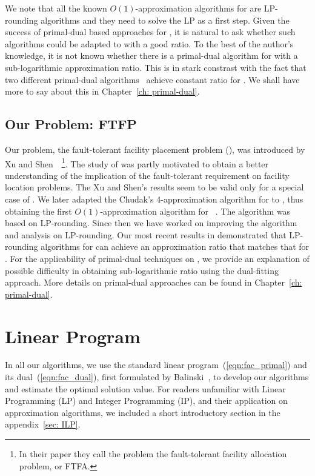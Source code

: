 \documentclass[oneside,final]{ucr}
\begin{document}
We note that all the known $O(1)$-approximation algorithms
for {\FTFL} are LP-rounding algorithms and they need to
solve the LP as a first step. Given the success of
primal-dual based approaches for {\UFL}, it is natural to
ask whether such algorithms could be adapted to {\FTFL} with
a good ratio. To the best of the author's knowledge, it is
not known whether there is a primal-dual algorithm for
{\FTFL} with a sub-logarithmic approximation ratio. This is
in stark constrast with the fact that two different
primal-dual algorithms~\cite{JainV03,JainMMSV03} achieve
constant ratio for {\UFL}. We shall have more to say about
this in Chapter~\ref{ch: primal-dual}.

\section{Our Problem: FTFP}
Our problem, the fault-tolerant facility placement problem
(\FTFP), was introduced by Xu and
Shen~\cite{XuS09}~\footnote{In their paper they call the
  problem the fault-tolerant facility allocation problem, or
  FTFA.}. The study of {\FTFP} was partly motivated to
obtain a better understanding of the implication of the
fault-tolerant requirement on facility location
problems. The Xu and Shen's results seem to be valid only
for a special case of {\FTFP}. We later adapted the Chudak's
4-approximation algorithm for {\UFL} to {\FTFP}, thus
obtaining the first $O(1)$-approximation algorithm for
{\FTFP}~\cite{YanC11}. The algorithm was based on
LP-rounding. Since then we have worked on improving the
algorithm and analysis on LP-rounding. Our most recent
results in \cite{YanC13} demonstrated that LP-rounding
algorithms for {\FTFP} can achieve an approximation ratio
that matches that for {\UFL}. For the applicability of
primal-dual techniques on {\FTFP}, we provide an explanation
of possible difficulty in obtaining sub-logarithmic ratio
using the dual-fitting approach. More details on primal-dual
approaches can be found in Chapter~\ref{ch: primal-dual}.


\chapter{Linear Program} \label{ch:lp} 

In all our algorithms, we use the standard linear
program~(\ref{eqn:fac_primal}) and its
dual~(\ref{eqn:fac_dual}), first formulated by
Balinski~\cite{Bal66}, to develop our algorithms and
estimate the optimal solution value. For readers unfamiliar
with Linear Programming (LP) and Integer Programming (IP),
and their application on approximation algorithms, we
included a short introductory section in the
appendix~\ref{sec: ILP}.
\end{document}
